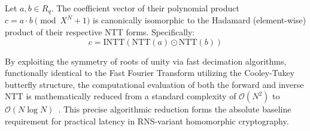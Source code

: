 \begin{theorem}
    Let $a, b \in R_q$. The coefficient vector of their polynomial product $c = a \cdot b \pmod{X^N+1}$ is canonically isomorphic to the Hadamard (element-wise) product of their respective NTT forms. Specifically:
    \begin{equation}
        c = \text{INTT}(\text{NTT}(a) \odot \text{NTT}(b))
    \end{equation}
    
    By exploiting the symmetry of roots of unity via fast decimation algorithms, functionally identical to the Fast Fourier Transform utilizing the Cooley-Tukey butterfly structure, the computational evaluation of both the forward and inverse NTT is mathematically reduced from a standard complexity of $\mathcal{O}(N^2)$ to $\mathcal{O}(N \log N)$~\cite{liang:2022}. This precise algorithmic reduction forms the absolute baseline requirement for practical latency in RNS-variant homomorphic cryptography.
\end{theorem}